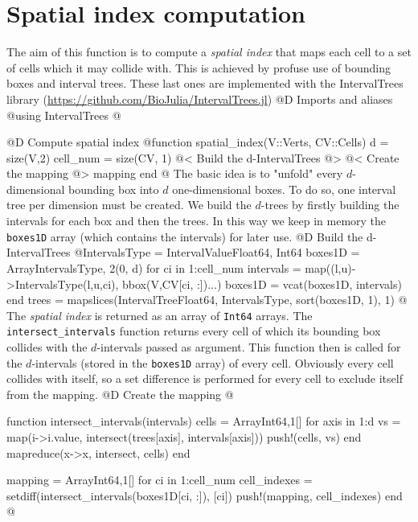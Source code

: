 \documentclass[10pt,oneside]{article}
\begin{document}
\section{Spatial index computation}
The aim of this function is to compute a \textit{spatial index} that maps
each cell to a set of cells which it may collide with.
This is achieved by profuse use of bounding boxes and interval trees. 
These last ones are implemented with the IntervalTrees library
(\url{https://github.com/BioJulia/IntervalTrees.jl})
@D Imports and aliases
@{using IntervalTrees
@}

@D Compute spatial index
@{function spatial_index(V::Verts, CV::Cells)
    d = size(V,2)
    cell_num = size(CV, 1)
    @< Build the d-IntervalTrees @>
    @< Create the mapping @>
    mapping
end
@}
The basic idea is to "unfold" every $d$-dimensional bounding box into $d$ one-dimensional boxes.
To do so, one interval tree per dimension must be created. 
We build the $d$-trees by firstly building the intervals for each box and then the trees.
In this way we keep in memory the \texttt{boxes1D} array (which contains the intervals) for later use.
@D Build the d-IntervalTrees
@{IntervalsType = IntervalValue{Float64, Int64}
boxes1D = Array{IntervalsType, 2}(0, d)
for ci in 1:cell_num
    intervals = map((l,u)->IntervalsType(l,u,ci), bbox(V,CV[ci, :])...)
    boxes1D = vcat(boxes1D, intervals)
end
trees = mapslices(IntervalTree{Float64, IntervalsType}, sort(boxes1D, 1), 1)
@}
The \textit{spatial index} is returned as an array of \texttt{Int64} arrays.
The \texttt{intersect\_intervals} function returns every cell of which its bounding box collides with 
the $d$-intervals passed as argument. This function then is called for the $d$-intervals (stored in the \texttt{boxes1D} array) of every cell.
Obviously every cell collides with itself, so a set difference is performed for every cell to exclude itself from the mapping.
@D Create the mapping
@{function intersect_intervals(intervals)
    cells = Array{Int64,1}[]
    for axis in 1:d
        vs = map(i->i.value, intersect(trees[axis], intervals[axis]))
        push!(cells, vs)
    end
    mapreduce(x->x, intersect, cells)
end

mapping = Array{Int64,1}[]
for ci in 1:cell_num
    cell_indexes = setdiff(intersect_intervals(boxes1D[ci, :]), [ci])
    push!(mapping, cell_indexes)
end
@}

\end{document}
